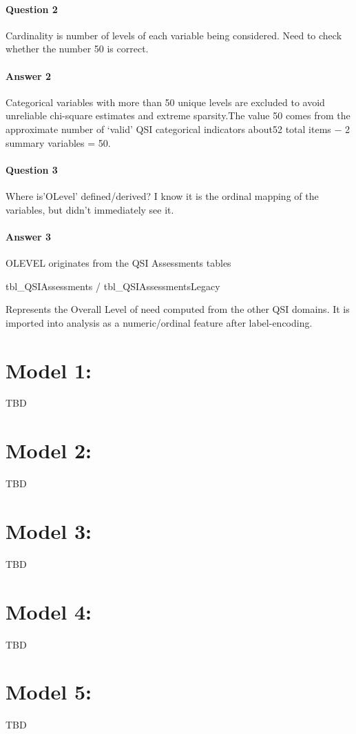 \documentclass[12pt, letterpaper]{article}
\begin{document}
\paragraph{Question 2} Cardinality is number of levels of each variable being considered. Need to check whether the number 50 is correct.
\paragraph{Answer 2} Categorical variables with more than 50 unique levels are excluded to avoid unreliable chi-square estimates and extreme sparsity.The value 50 comes from the approximate number of `valid' QSI categorical indicators about52 total items − 2 summary variables = 50.
\paragraph{Question 3} Where is'OLevel' defined/derived? I know it is the ordinal mapping of the variables, but didn't immediately see it.
\paragraph{Answer 3}OLEVEL originates from the QSI Assessments tables 

tbl_QSIAssessments / tbl_QSIAssessmentsLegacy

Represents the Overall Level of need computed from the other QSI domains. It is imported into analysis as a numeric/ordinal feature after label-encoding.
\section{Model 1:} 
TBD


\section{Model 2:}
TBD


\section{Model 3:}
TBD


\section{Model 4:} 
TBD


\section{Model 5:} 
TBD
\end{document}
